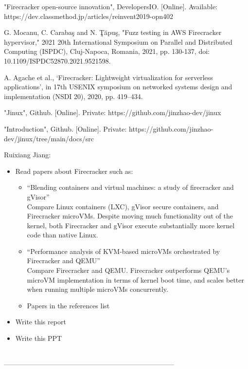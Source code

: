 \documentclass[conference]{IEEEtran}
\begin{document}
\begin{thebibliography}{00}
 "Firecracker open-source innovation", DevelopersIO. [Online]. Available: https://dev.classmethod.jp/articles/reinvent2019-opn402

 G. Mocanu, C. Carabaş and N. Ţăpuş, "Fuzz testing in AWS Firecracker hypervisor," 2021 20th International Symposium on Parallel and Distributed Computing (ISPDC), Cluj-Napoca, Romania, 2021, pp. 130-137, doi: 10.1109/ISPDC52870.2021.9521598.

 A. Agache et al., ‘Firecracker: Lightweight virtualization for serverless applications’, in 17th USENIX symposium on networked systems design and implementation (NSDI 20), 2020, pp. 419–434.

 "Jinux", Github. [Online]. Private: https://github.com/jinzhao-dev/jinux

 "Introduction", Github. [Online]. Private: https://github.com/jinzhao-dev/jinux/tree/main/docs/src

\end{thebibliography}


\vspace{12pt}

\color{blue}

Ruixiang Jiang:\\
\begin{itemize}
	\item Read papers about Firecracker such as:
	\begin{itemize}
	\item ``Blending containers and virtual machines: a study of firecracker and gVisor''\\
		Compare Linux containers (LXC), gVisor secure containers, and Firecracker microVMs. Despite moving much functionality out of the kernel, both Firecracker and gVisor execute substantially more kernel code than native Linux.
	\item ``Performance analysis of KVM-based microVMs orchestrated by Firecracker and QEMU''\\
		Compare Firecracker and QEMU. Firecracker outperforms QEMU’s microVM implementation in terms of kernel boot time, and scales better when running multiple microVMs concurrently.
	\item Papers in the references list
	\end{itemize}
	\item Write this report
	\item Write this PPT
\end{itemize}
\\
---------------------------------------------------------------------------\\
\end{document}
